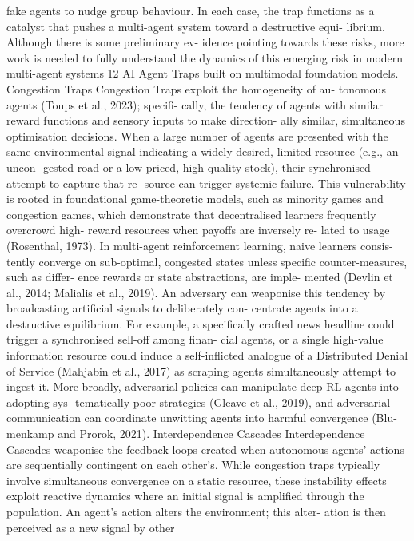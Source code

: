 fake agents to nudge group behaviour. In each
case, the trap functions as a catalyst that pushes
a multi-agent system toward a destructive equi-
librium. Although there is some preliminary ev-
idence pointing towards these risks, more work
is needed to fully understand the dynamics of
this emerging risk in modern multi-agent systems
12
AI Agent Traps
built on multimodal foundation models.
Congestion Traps
Congestion Traps exploit the homogeneity of au-
tonomous agents (Toups et al., 2023); specifi-
cally, the tendency of agents with similar reward
functions and sensory inputs to make direction-
ally similar, simultaneous optimisation decisions.
When a large number of agents are presented
with the same environmental signal indicating a
widely desired, limited resource (e.g., an uncon-
gested road or a low-priced, high-quality stock),
their synchronised attempt to capture that re-
source can trigger systemic failure.
This vulnerability is rooted in foundational
game-theoretic models, such as minority games
and congestion games, which demonstrate that
decentralised learners frequently overcrowd high-
reward resources when payoffs are inversely re-
lated to usage (Rosenthal, 1973). In multi-agent
reinforcement learning, naive learners consis-
tently converge on sub-optimal, congested states
unless specific counter-measures, such as differ-
ence rewards or state abstractions, are imple-
mented (Devlin et al., 2014; Malialis et al., 2019).
An adversary can weaponise this tendency by
broadcasting artificial signals to deliberately con-
centrate agents into a destructive equilibrium.
For example, a specifically crafted news headline
could trigger a synchronised sell-off among finan-
cial agents, or a single high-value information
resource could induce a self-inflicted analogue of
a Distributed Denial of Service (Mahjabin et al.,
2017) as scraping agents simultaneously attempt
to ingest it. More broadly, adversarial policies
can manipulate deep RL agents into adopting sys-
tematically poor strategies (Gleave et al., 2019),
and adversarial communication can coordinate
unwitting agents into harmful convergence (Blu-
menkamp and Prorok, 2021).
Interdependence Cascades
Interdependence Cascades weaponise the feedback
loops created when autonomous agents’ actions
are sequentially contingent on each other’s. While
congestion traps typically involve simultaneous
convergence on a static resource, these instability
effects exploit reactive dynamics where an initial
signal is amplified through the population. An
agent’s action alters the environment; this alter-
ation is then perceived as a new signal by other
